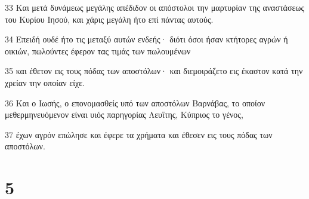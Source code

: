\par 33 Και μετά δυνάμεως μεγάλης απέδιδον οι απόστολοι την μαρτυρίαν της αναστάσεως του Κυρίου Ιησού, και χάρις μεγάλη ήτο επί πάντας αυτούς.
\par 34 Επειδή ουδέ ήτο τις μεταξύ αυτών ενδεής· διότι όσοι ήσαν κτήτορες αγρών ή οικιών, πωλούντες έφερον τας τιμάς των πωλουμένων
\par 35 και έθετον εις τους πόδας των αποστόλων· και διεμοιράζετο εις έκαστον κατά την χρείαν την οποίαν είχε.
\par 36 Και ο Ιωσής, ο επονομασθείς υπό των αποστόλων Βαρνάβας, το οποίον μεθερμηνευόμενον είναι υιός παρηγορίας Λευΐτης, Κύπριος το γένος,
\par 37 έχων αγρόν επώλησε και έφερε τα χρήματα και έθεσεν εις τους πόδας των αποστόλων.

\chapter{5}

